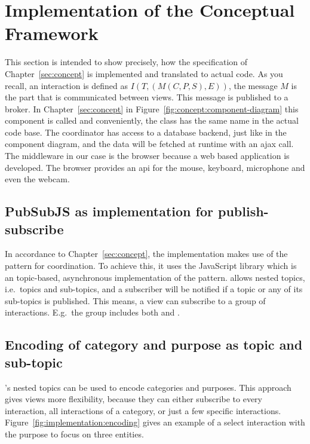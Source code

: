 \section{Implementation of the Conceptual Framework}\label{sec:implementation:concept-translation}
This section is intended to show precisely, how the specification of Chapter~\ref{sec:concept} is implemented and translated to actual code.
As you recall, an interaction is defined as $I(T,(M(C,P,S),E))$, the message $M$ is the part that is communicated between views.
This message is published to a  broker.
In Chapter~\ref{sec:concept} in Figure~\ref{fig:concept:component-diagram} this component is called  and conveniently, the class has the same name in the actual code base.
The coordinator has access to a database backend, just like in the component diagram, and the data will be fetched at runtime with an \gls{ajax} call.
The  middleware in our case is the browser because a web based application is developed.
The browser provides an \gls{api} for the mouse, keyboard, microphone and even the webcam.

\subsection{PubSubJS as implementation for publish-subscribe}
In accordance to Chapter~\ref{sec:concept}, the implementation makes use of the  pattern for coordination.
To achieve this, it uses the JavaScript library  which is an topic-based, asynchronous implementation of the pattern.
 allows nested topics, i.e.\ topics and sub-topics, and a subscriber will be notified if a topic or any of its sub-topics is published.
This means, a view can subscribe to a group of interactions.
E.g.\ the group  includes both  and .

\subsection{Encoding of category and purpose as topic and sub-topic}\label{sec:implementationnceptual Framework}\label{sec:implementation:concept:translation:subject-purpose}
's nested topics can be used to encode categories and purposes.
This approach gives views more flexibility, because they can either subscribe to every interaction, all interactions of a category, or just a few specific interactions.
Figure~\ref{fig:implementation:encoding} gives an example of a select interaction with the purpose to focus on three entities.

